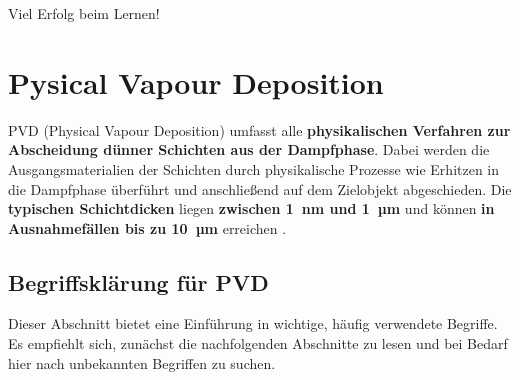 \documentclass{article} %
\begin{document}
\vspace{1em}

Viel Erfolg beim Lernen!

\vspace{1em}
\section{Pysical Vapour Deposition} %
PVD (Physical Vapour Deposition) umfasst alle \textbf{physikalischen Verfahren zur Abscheidung dünner Schichten aus der Dampfphase}.
Dabei werden die Ausgangsmaterialien der Schichten durch physikalische Prozesse wie Erhitzen in die Dampfphase überführt und anschließend 
auf dem Zielobjekt abgeschieden. Die \textbf{typischen Schichtdicken} liegen \textbf{zwischen 1~nm und 1~µm} und können 
\textbf{in Ausnahmefällen bis zu 10~µm} erreichen \cite{keplinger2024}.

\vspace{1em}
\subsection{Begriffsklärung für PVD} %
Dieser Abschnitt bietet eine Einführung in wichtige, häufig verwendete Begriffe. Es empfiehlt sich, zunächst die nachfolgenden Abschnitte zu lesen 
und bei Bedarf hier nach unbekannten Begriffen zu suchen.
\end{document}
